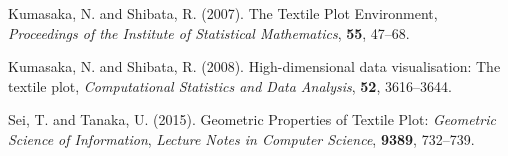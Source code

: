 \documentclass[12pt]{article}
\begin{document}
\begin{description}

%
%
%
%
\item
Kumasaka, N. and Shibata, R. (2007). The Textile Plot Environment, \textit{Proceedings of the Institute of Statistical Mathematics}, \textbf{55}, 47--68.
\item
Kumasaka, N. and Shibata, R. (2008). High-dimensional data visualisation: The textile plot, \textit{Computational Statistics and Data Analysis}, \textbf{52}, 3616--3644.
\item
Sei, T. and Tanaka, U. (2015). Geometric Properties of Textile Plot: \textit{Geometric Science of Information}, \textit{Lecture Notes in Computer Science}, \textbf{9389}, 732--739.

\end{description}
\end{document}
